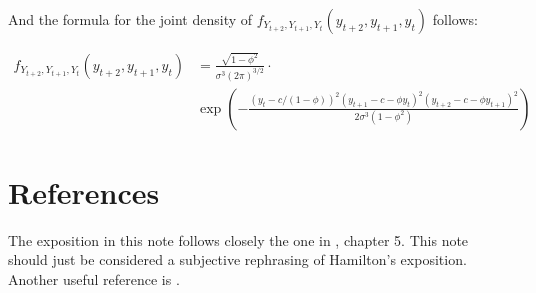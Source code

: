\documentclass[12pt]{article}
\begin{document}
And the formula for the joint density of $f_{Y_{t+2}, Y_{t+1}, Y_t} (y_{t+2}, y_{t+1},
 y_t)$ follows:

\begin{eqnarray*}
\label{threevariate_density}
f_{Y_{t+2}, Y_{t+1}, Y_t} (y_{t+2}, y_{t+1}, y_t)& =
\frac{\sqrt{1 - \phi^2}}{\sigma^3 (2 \pi)^{3/2}} \cdot \\
& \exp \left(
-\frac{(y_t - c/(1-\phi))^2
(y_{t+1} - c - \phi y_t)^2
(y_{t+2} - c - \phi y_{t+1})^2}
{2\sigma^3(1- \phi^2)} 
\right)
\end{eqnarray*}

\section{References}
The exposition in this note follows closely the one in \cite{hamilton_tsa}, chapter 5. 
This note should just be considered a subjective rephrasing of Hamilton's exposition.
Another useful reference is \cite{fuller_intro_tsa}.



\end{document}
